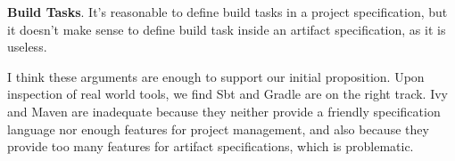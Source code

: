 \textbf{Build Tasks}. It's reasonable to define build tasks in a project specification, but it doesn't make sense to define build task inside an artifact specification, as it is useless.

I think these arguments are enough to support our initial proposition. Upon inspection of real world tools, we find Sbt and Gradle are on the right track. Ivy and Maven are inadequate because they neither provide a friendly specification language nor enough features for project management, and also because they provide too many features for artifact specifications, which is problematic.


